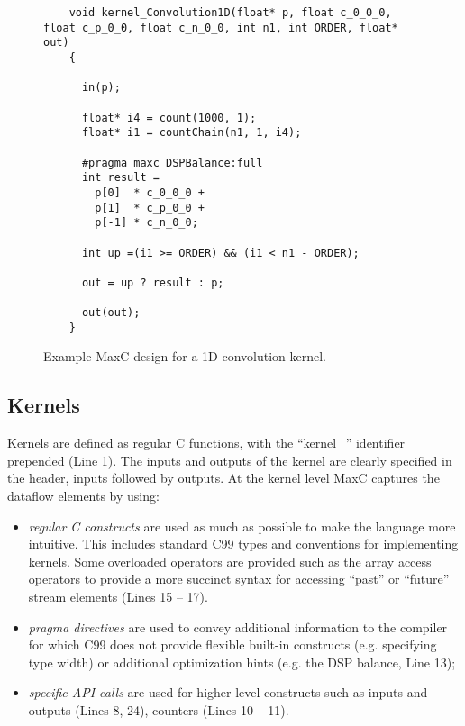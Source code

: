 \begin{figure}
  \begin{lstlisting}
    void kernel_Convolution1D(float* p, float c_0_0_0, float c_p_0_0, float c_n_0_0, int n1, int ORDER, float* out)
    {

      in(p);

      float* i4 = count(1000, 1);
      float* i1 = countChain(n1, 1, i4);

      #pragma maxc DSPBalance:full
      int result =
        p[0]  * c_0_0_0 +
        p[1]  * c_p_0_0 +
        p[-1] * c_n_0_0;

      int up =(i1 >= ORDER) && (i1 < n1 - ORDER);

      out = up ? result : p;

      out(out);
    }
  \end{lstlisting}
  \caption{Example MaxC design for a 1D convolution kernel.}
  \label{fig:maxc-1dconv}
\end{figure}

\subsection{Kernels}

Kernels are defined as regular C functions, with the ``kernel\_''
identifier prepended (Line 1). The inputs and outputs of the kernel
are clearly specified in the header, inputs followed by outputs. At
the kernel level MaxC captures the dataflow elements by using:

\begin{itemize}
\item \emph{regular C constructs} are used as much as possible to make
  the language more intuitive. This includes standard C99 types and
  conventions for implementing kernels. Some overloaded operators are
  provided such as the array access operators to provide a more
  succinct syntax for accessing ``past'' or ``future'' stream elements
  (Lines 15 -- 17).

\item \emph{pragma directives} are used to convey additional
  information to the compiler for which C99 does not provide flexible
  built-in constructs (e.g. specifying type width) or additional
  optimization hints (e.g. the DSP balance, Line 13);

\item \emph{specific API calls} are used for higher level constructs
  such as inputs and outputs (Lines 8, 24), counters (Lines 10 -- 11).

\end{itemize}


